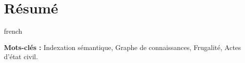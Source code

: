 \clearpage
\chapter*{Résumé}
\thispagestyle{plain} %

\begin{otherlanguage*}{french}

    \vspace{1em}
    \noindent\textbf{Mots-clés :} Indexation sémantique, Graphe de connaissances, Frugalité, Actes d'état civil.
\end{otherlanguage*}